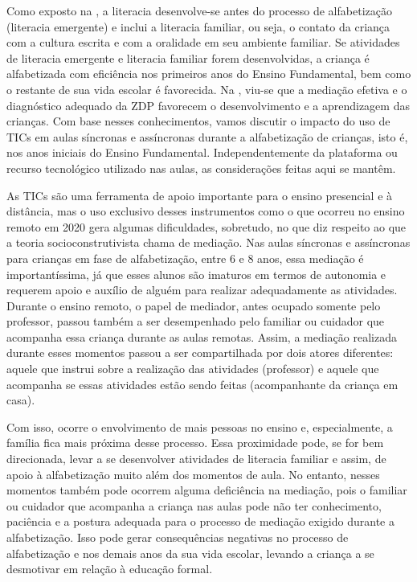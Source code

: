 \documentclass{textolivre}
\begin{document}
Como exposto na , a literacia desenvolve-se antes do processo de alfabetização (literacia emergente) e inclui a literacia familiar, ou seja, o contato da criança com a cultura escrita e com a oralidade em seu ambiente familiar. Se atividades de literacia emergente e literacia familiar forem desenvolvidas, a criança é alfabetizada com eficiência nos primeiros anos do Ensino Fundamental, bem como o restante de sua vida escolar é favorecida. Na , viu-se que a mediação efetiva e o diagnóstico adequado da ZDP favorecem o desenvolvimento e a aprendizagem das crianças. Com base nesses conhecimentos, vamos discutir o impacto do uso de TICs em aulas síncronas e assíncronas durante a alfabetização de crianças, isto é, nos anos iniciais do Ensino Fundamental. Independentemente da plataforma ou recurso tecnológico utilizado nas aulas, as considerações feitas aqui se mantêm. 

As TICs são uma ferramenta de apoio importante para o ensino presencial e à distância, mas o uso exclusivo desses instrumentos como o que ocorreu no ensino remoto em 2020 gera algumas dificuldades, sobretudo, no que diz respeito ao que a teoria socioconstrutivista chama de mediação. Nas aulas síncronas e assíncronas para crianças em fase de alfabetização, entre 6 e 8 anos, essa mediação é importantíssima, já que esses alunos são imaturos em termos de autonomia e requerem apoio e auxílio de alguém para realizar adequadamente as atividades. Durante o ensino remoto, o papel de mediador, antes ocupado somente pelo professor, passou também a ser desempenhado pelo familiar ou cuidador que acompanha essa criança durante as aulas remotas. Assim, a mediação realizada durante esses momentos passou a ser compartilhada por dois atores diferentes: aquele que instrui sobre a realização das atividades (professor) e aquele que acompanha se essas atividades estão sendo feitas (acompanhante da criança em casa). 

Com isso, ocorre o envolvimento de mais pessoas no ensino e, especialmente, a família fica mais próxima desse processo. Essa proximidade pode, se for bem direcionada, levar a se desenvolver atividades de literacia familiar e assim, de apoio à alfabetização muito além dos momentos de aula. No entanto, nesses momentos também pode ocorrem alguma deficiência na mediação, pois o familiar ou cuidador que acompanha a criança nas aulas pode não ter conhecimento, paciência e a postura adequada para o processo de mediação exigido durante a alfabetização. Isso pode gerar consequências negativas no processo de alfabetização e nos demais anos da sua vida escolar, levando a criança a se desmotivar em relação à educação formal.
\end{document}
